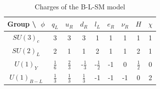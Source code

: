 \documentclass[12pt]{article}
\begin{document}
\begin{table}[H]
\centering
\begin{tabular}{|c|c|c|c|c|c|c|c|c|}
\hline
 Group \textbackslash $\;$ $\phi$ & $q_L$  & $u_R$ & $d_R$ & $l_L$  & $e_R$ & $\nu_R$  &  $H$  & $\chi$  \\ \hline
 $SU(3)_c$& 3 & 3 & 3 & 1 & 1 & 1 & 1  & 1  \\
 $SU(2)_L$& 2  & 1 & 1 & 2 & 1 & 1 & 2  & 1 \\
$U(1)_Y$ & $\frac{1}{6}$ & $\frac{2}{3}$  & -$\frac{1}{3}$  & -$\frac{1}{2}$ & -1 & 0 & $\frac{1}{2}$ & 0 \\
$U(1)_{B-L}$ & $\frac{1}{3}$ & $\frac{1}{3}$ & $\frac{1}{3}$  & -1  & -1 &-1  & 0 & 2  \\ \hline 
\end{tabular}
\caption{Charges of the B-L-SM model}
\label{killmelol}
\end{table} 
\end{document}
